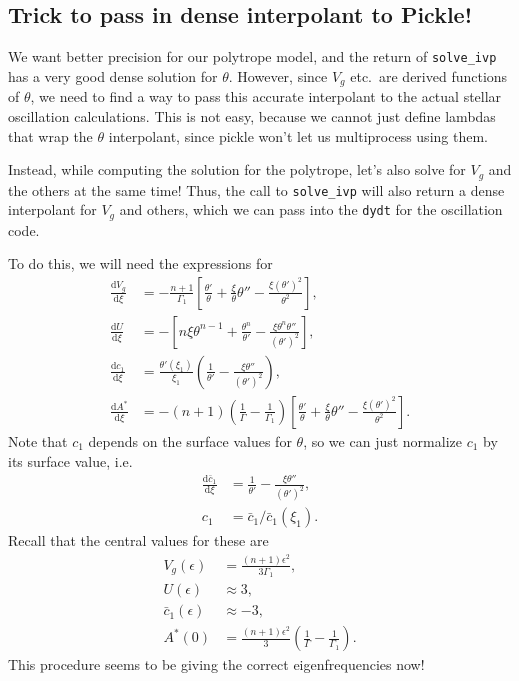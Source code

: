 \documentclass[11pt,
        usenames, %
        twocolumn,
        landscape,
        dvipsnames %
    ]{article}
\newcommand*{\rd}[2]{\frac{\mathrm{d}#1}{\mathrm{d}#2}}
\newcommand*{\p}[1]{\left(#1\right)}
\newcommand*{\s}[1]{\left[#1\right]}
\begin{document}
\subsection{Trick to pass in dense interpolant to Pickle!}

We want better precision for our polytrope model, and the return of
\lstinline{solve_ivp} has a very good dense solution for $\theta$. However,
since $V_g$ etc.\ are derived functions of $\theta$, we need to find a way to
pass this accurate interpolant to the actual stellar oscillation calculations.
This is not easy, because we cannot just define lambdas that wrap the $\theta$
interpolant, since pickle won't let us multiprocess using them.

Instead, while computing the solution for the polytrope, let's also solve for
$V_g$ and the others at the same time! Thus, the call to \lstinline{solve_ivp}
will also return a dense interpolant for $V_g$ and others, which we can pass
into the \lstinline{dydt} for the oscillation code.

To do this, we will need the expressions for
\begin{align}
    \rd{V_g}{\xi} &= -\frac{n + 1}{\Gamma_1}\s{
            \frac{\theta'}{\theta} + \frac{\xi}{\theta}\theta''
            - \frac{\xi \p{\theta'}^2}{\theta^2}
        },\\
    \rd{U}{\xi} &= -\s{
        n\xi\theta^{n-1} + \frac{\theta^n}{\theta'}
        - \frac{\xi \theta^n \theta''}{(\theta')^2}},\\
    \rd{c_1}{\xi} &= \frac{\theta'(\xi_1)}{\xi_1}
        \p{\frac{1}{\theta'} - \frac{\xi \theta''}{(\theta')^2}},\\
    \rd{A^*}{\xi} &= -(n + 1)\p{\frac{1}{\Gamma} - \frac{1}{\Gamma_1}}\s{
            \frac{\theta'}{\theta} + \frac{\xi}{\theta}\theta''
            - \frac{\xi \p{\theta'}^2}{\theta^2}
        }.
\end{align}
Note that $c_1$ depends on the surface values for $\theta$, so we can just
normalize $c_1$ by its surface value, i.e.
\begin{align}
    \rd{\bar{c}_1}{\xi} &= \frac{1}{\theta'}
        - \frac{\xi \theta''}{(\theta')^2},\\
    c_1 &= \bar{c}_1 / \bar{c}_1(\xi_1).
\end{align}
Recall that the central values for these are
\begin{align}
    V_g(\epsilon) &= \frac{(n + 1) \epsilon^2}{3\Gamma_1},\\
    U(\epsilon) &\approx 3,\\
    \bar{c}_1(\epsilon) &\approx -3,\\
    A^*(0) &= \frac{(n + 1) \epsilon^2}{3}\p{\frac{1}{\Gamma} - \frac{1}{\Gamma_1}}.
\end{align}
This procedure seems to be giving the correct eigenfrequencies now!
\end{document}
